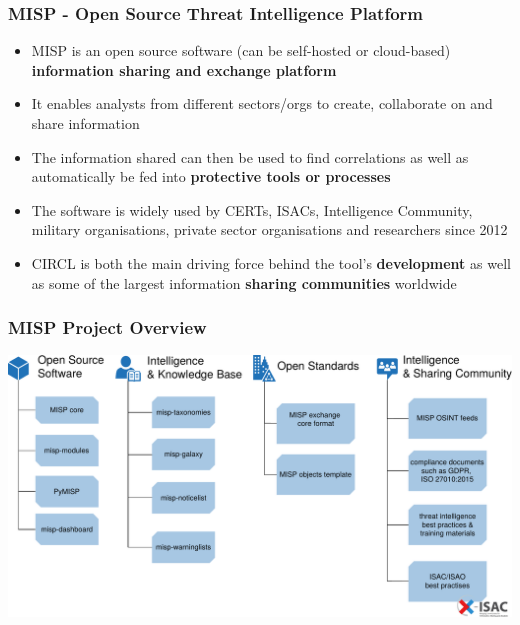 
\begin{frame}[t,plain]
\titlepage
\end{frame}


\begin{frame}
\frametitle{MISP - Open Source Threat Intelligence Platform}
        \begin{itemize}
                \item MISP is an open source software (can be self-hosted or cloud-based) {\bf information sharing and exchange platform}
                \item It enables analysts from different sectors/orgs to create, collaborate on and share information
                \item The information shared can then be used to find correlations as well as automatically be fed into {\bf protective tools or processes}
                \item The software is widely used by CERTs, ISACs, Intelligence Community, military organisations, private sector organisations and researchers since 2012
                \item CIRCL is both the main driving force behind the tool's {\bf development} as well as some of the largest information {\bf sharing communities} worldwide
        \end{itemize}
\end{frame}

\begin{frame}
        \frametitle{MISP Project Overview}
        \includegraphics[scale=0.42]{misp-overview-simplified.pdf}\\
\end{frame}


